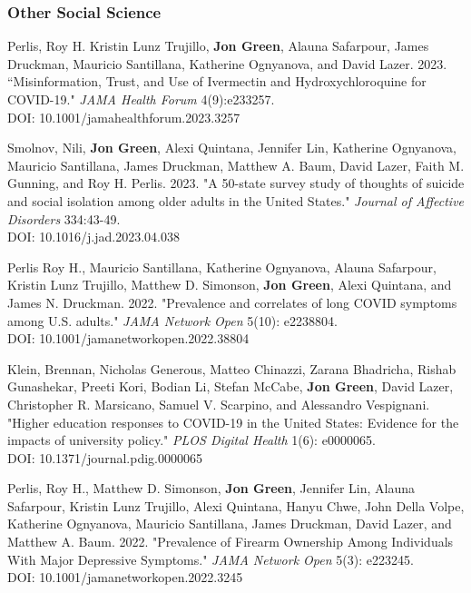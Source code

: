 \documentclass[letterpaper]{article}
\begin{document}
\subsubsection*{Other Social Science}

\begin{etaremune}

\item Perlis, Roy H. Kristin Lunz Trujillo, \textbf{Jon Green}, Alauna Safarpour, James Druckman, Mauricio Santillana, Katherine Ognyanova, and David Lazer. 2023. ``Misinformation, Trust, and Use of Ivermectin and Hydroxychloroquine for COVID-19." \textit{JAMA Health Forum} 4(9):e233257. \\
DOI: 10.1001/jamahealthforum.2023.3257

\item Smolnov, Nili, \textbf{Jon Green}, Alexi Quintana, Jennifer Lin, Katherine Ognyanova, Mauricio Santillana, James Druckman, Matthew A. Baum, David Lazer, Faith M. Gunning, and Roy H. Perlis. 2023. "A 50-state survey study of thoughts of suicide and social isolation among older adults in the United States." \textit{Journal of Affective Disorders} 334:43-49. \\
DOI: 10.1016/j.jad.2023.04.038

\item Perlis Roy H., Mauricio Santillana, Katherine Ognyanova, Alauna Safarpour, Kristin Lunz Trujillo, Matthew D. Simonson, \textbf{Jon Green}, Alexi Quintana, and James N. Druckman. 2022. "Prevalence and correlates of long COVID symptoms among U.S. adults." \textit{JAMA Network Open} 5(10): e2238804. \\
DOI: 10.1001/jamanetworkopen.2022.38804

\item Klein, Brennan, Nicholas Generous, Matteo Chinazzi, Zarana Bhadricha, Rishab Gunashekar, Preeti Kori, Bodian Li, Stefan McCabe, \textbf{Jon Green}, David Lazer, Christopher R. Marsicano, Samuel V. Scarpino, and Alessandro Vespignani. "Higher education responses to COVID-19 in the United States: Evidence for the impacts of university policy." \textit{PLOS Digital Health} 1(6): e0000065. \\
DOI: 10.1371/journal.pdig.0000065

\item  Perlis, Roy H., Matthew D. Simonson, \textbf{Jon Green}, Jennifer Lin, Alauna Safarpour, Kristin Lunz Trujillo, Alexi Quintana, Hanyu Chwe, John Della Volpe, Katherine Ognyanova, Mauricio Santillana,  James Druckman, David Lazer, and Matthew A. Baum. 2022. "Prevalence of Firearm Ownership Among Individuals With Major Depressive Symptoms." \textit{JAMA Network Open} 5(3): e223245. \\
DOI: 10.1001/jamanetworkopen.2022.3245


\end{etaremune}
\end{document}
